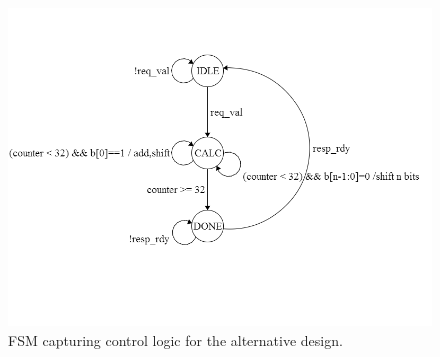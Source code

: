 \documentclass[11pt]{article}
\begin{document}
\begin{figure}[b]
\centering
\includegraphics[scale=0.6]{AltFSM}
\caption{FSM capturing control logic for the alternative design.}
\label{fig:AltFSM}
\end{figure}
\end{document}
